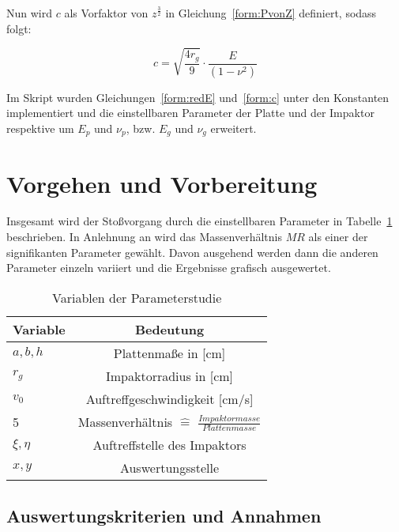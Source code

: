 Nun wird $c$ als Vorfaktor von $z^{\frac{3}{2}}$ in Gleichung~\ref{form:PvonZ} definiert, sodass folgt:

\begin{equation}
	\label{form:c}
	c = \sqrt{\frac{4 r_{g}}{9}} \cdot \frac{E}{(1 - \nu^{2})}
\end{equation}

Im Skript wurden Gleichungen~\ref{form:redE} und~\ref{form:c} unter den Konstanten implementiert und die einstellbaren Parameter der Platte und der Impaktor respektive um $E_{p}$ und $\nu_{p}$, bzw. $E_{g}$ und $\nu_{g}$ erweitert.\\

\section{Vorgehen und Vorbereitung}

Insgesamt wird der Stoßvorgang durch die einstellbaren Parameter in Tabelle~\ref{tab:VariablenderStudie} beschrieben. In Anlehnung an \cite{Olsson.2000} wird das Massenverhältnis $MR$ als einer der signifikanten Parameter gewählt. Davon ausgehend werden dann die anderen Parameter einzeln variiert und die Ergebnisse grafisch ausgewertet. 

\begin{table}[H]
	\begin{center}
		\caption{Variablen der Parameterstudie}
		\label{tab:VariablenderStudie}
		\begin{tabular}{l|c}
			\textbf{Variable} & \textbf{Bedeutung}\\
			\hline
			$a,b,h$ & Plattenmaße in [cm]\\
			$r_{g}$ & Impaktorradius in [cm]\\
			$v_{0}$ & Auftreffgeschwindigkeit [cm/s]\\
			5 & Massenverhältnis $\hat{=}$ $\frac{Impaktormasse}{Plattenmasse}$\\
			$\xi,\eta$ & Auftreffstelle des Impaktors\\
			$x,y$ & Auswertungsstelle\\		
		\end{tabular}
	\end{center}
\end{table}

\subsection*{Auswertungskriterien und Annahmen}

